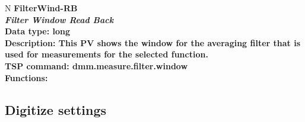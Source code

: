 \documentclass[openany]{article}
\begin{document}
		\begin{tabular}{N}
			\hline
			\bfseries FilterWind-RB\label{pv:filterwind-rb} \\ \hline
			\emph{Filter Window Read Back} \\
			Data type: long \\
			Description: This PV shows the window for the averaging filter that is used for measurements for the selected function. \\
			TSP command: dmm.measure.filter.window \\
			Functions: \\
			\arrayrulecolor{\FuncTableBorderColor}

		\end{tabular}
	
	\subsection{Digitize settings}\label{pvgroup:digitize-settings}

		\paragraph{} %
\end{document}
